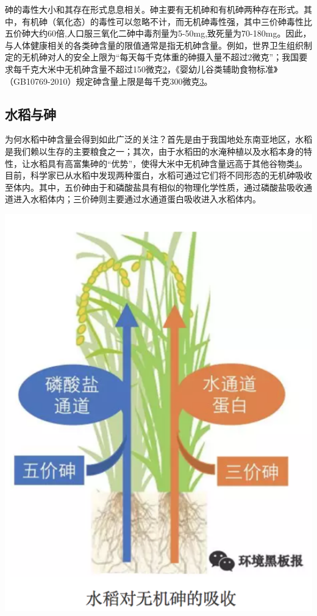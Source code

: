 \documentclass[]{book}
\begin{document}
砷的毒性大小和其存在形式息息相关。砷主要有无机砷和有机砷两种存在形式。其中，有机砷（氧化态）的毒性可以忽略不计，而无机砷毒性强，其中三价砷毒性比五价砷大约60倍,人口服三氧化二砷中毒剂量为5-50mg,致死量为70-180mg。因此，与人体健康相关的各类砷含量的限值通常是指无机砷含量。例如，世界卫生组织制定的无机砷对人的安全上限为``每天每千克体重的砷摄入量不超过2微克''；我国要求每千克大米中无机砷含量不超过150微克\href{Kezhen\%20Qian,\%20Ajay\%20Kumar,\%20et.al.\%20Renew.\%20and\%20Sustain.\%20Energy\%20Reviews,\%202015,\%2042:\%201055-1064.}{2}，《婴幼儿谷类辅助食物标准》（GB10769-2010）规定砷含量上限是每千克300微克\href{Puga\%20A\%20P,\%20Abreu\%20C\%20A,\%20et\%20al.\%20J.\%20of\%20Environ.\%20Manage.,\%202015,\%20159:\%2086–93.}{3}。

\subsection{水稻与砷}

为何水稻中砷含量会得到如此广泛的关注？首先是由于我国地处东南亚地区，水稻是我们赖以生存的主要粮食之一；其次，由于水稻田的水淹种植以及水稻本身的特性，让水稻具有高富集砷的``优势''，使得大米中无机砷含量远高于其他谷物类\href{Khan\%20S,\%20Cai\%20Chao,\%20et\%20al．\%20Environ.\%20Sci.\%20\&\%20Technol.,\%202013,\%2047\%20:\%208624-8632．}{4}。目前，科学家已从水稻中发现两种蛋白，水稻可通过它们将不同形态的无机砷吸收至体内。其中，五价砷由于和磷酸盐具有相似的物理化学性质，通过磷酸盐吸收通道进入水稻体内；三价砷则主要通过水通道蛋白吸收进入水稻体内。

\includegraphics[width=6.44in]{images/as3}
\end{document}
